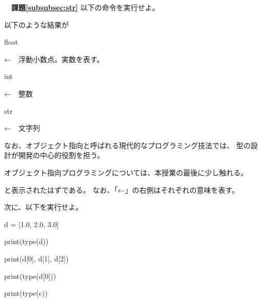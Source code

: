 {\bfseries　課題\ref{subsubsec:str}}
以下の命令を実行せよ。



以下のような結果が
\begin{itemize}
	{\ttfamily \item float} ←　浮動小数点。実数を表す。
	{\ttfamily \item int} ←　整数
	{\ttfamily \item str} ←　文字列
\end{itemize}

なお、オブジェクト指向と呼ばれる現代的なプログラミング技法では、
型の設計が開発の中心的役割を担う。

オブジェクト指向プログラミングについては、本授業の最後に少し触れる。


と表示されたはずである。
なお、「←」の右側はそれぞれの意味を表す。

次に、以下を実行せよ。

\begin{itemize}
	{\ttfamily 
		\item d = [1.0, 2.0, 3.0]
		
		print(type(d))
		
		\item print(d[0], d[1], d[2])
				
		\item print(type(d[0]))
		
		print(type(c))
	}
\end{itemize}




\subsection{}

